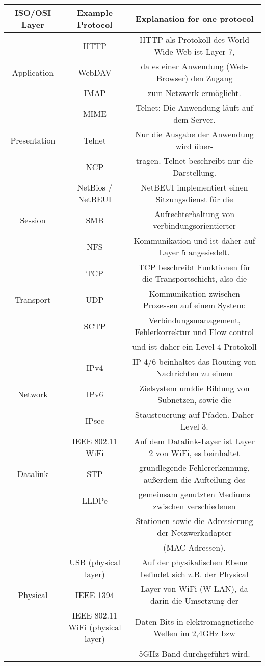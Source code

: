 \documentclass[a4paper,
			llpt,
			solution,
			accentcolor=tud2d,
			colorbacktitle
			]
			{tudexercise}
\begin{document}
\begin{center}
\begin{tabular}{|c|c|c|}
\hline
ISO/OSI Layer
&
Example Protocol
&
Explanation for one protocol
\\
\hline
&HTTP& HTTP als Protokoll des World Wide Web ist Layer 7,
\\ \cline {2-2}
Application & WebDAV &  da es einer Anwendung (Web-Browser) den Zugang
\\ \cline {2-2}
&IMAP& zum Netzwerk ermöglicht.
\\ \hline
&MIME& Telnet: Die Anwendung läuft auf dem Server.
\\ \cline {2-2}
Presentation &Telnet&Nur die Ausgabe der Anwendung wird über-
\\ \cline {2-2}
&NCP&tragen. Telnet beschreibt nur die Darstellung.
\\ \hline
&NetBios / NetBEUI& NetBEUI implementiert einen Sitzungsdienst für die
\\ \cline {2-2}
Session & SMB & Aufrechterhaltung  von verbindungsorientierter 
\\ \cline {2-2}
& NFS & Kommunikation und ist daher auf Layer 5 angesiedelt.
\\ \hline
&TCP& 		    TCP beschreibt Funktionen für die Transportschicht, also die   
\\ \cline {2-2}
Transport &UDP& Kommunikation zwischen Prozessen auf einem System: 
\\ \cline {2-2}
&SCTP&          Verbindungsmanagement, Fehlerkorrektur und Flow control  
\\
&& und ist daher ein Level-4-Protokoll
\\ \hline
&IPv4&          IP 4/6 beinhaltet das Routing von Nachrichten zu einem 
\\ \cline {2-2}
Network &IPv6&  Zielsystem unddie Bildung von Subnetzen, sowie die 
\\ \cline {2-2}
&IPsec&         Stausteuerung auf Pfaden. Daher Level 3.
\\ \hline
&IEEE 802.11 WiFi&   Auf dem Datalink-Layer ist Layer 2 von WiFi, es beinhaltet  
\\ \cline {2-2}
Datalink &STP&       grundlegende Fehlererkennung, außerdem die Aufteilung des 
\\ \cline {2-2}
&LLDPe&              gemeinsam genutzten Mediums zwischen verschiedenen  
\\ &&Stationen sowie die Adressierung der Netzwerkadapter \\ && (MAC-Adressen).
\\ \hline
&USB (physical layer)&               Auf der physikalischen Ebene befindet sich z.B. der Physical
\\ \cline {2-2}
Physical &IEEE 1394&                 Layer von WiFi (W-LAN), da darin die Umsetzung der 
\\ \cline {2-2}
&IEEE 802.11 WiFi (physical layer)&  Daten-Bits in elektromagnetische Wellen im 2,4GHz bzw 
\\ && 5GHz-Band durchgeführt wird.
\\ \hline
\end{tabular}
\end{center}
\end{document}
